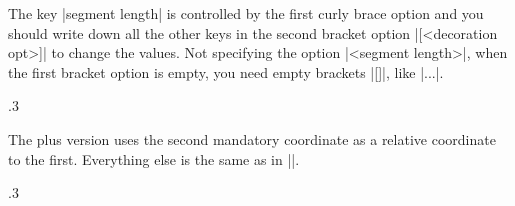 The key |segment length| is controlled by the first curly brace option and you should write down all the other keys in the second bracket option |[<decoration opt>]| to change the values. Not specifying the option |{<segment length>}|, when the first bracket option is empty, you need empty brackets |[]|, like |\tzsnake[][<decoration op>]...|.

\begin{tzcode}{.3}
\end{tzcode}

The plus version \icmd{\tzsnake+} uses the second mandatory coordinate as a relative coordinate to the first. Everything else is the same as in |\tzsnake|.


\begin{tzcode}{.3}
\end{tzcode}


